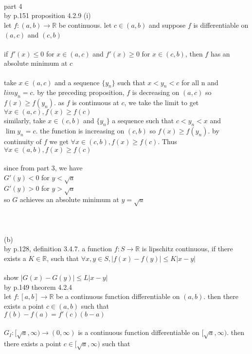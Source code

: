 \documentclass[12pt, border = 4pt, multi]{article} %
\begin{document}
\\
\\
\\
part 4\\
by p.151 proposition 4.2.9 (i)\\
let $f: (a, b) \rightarrow \mathbb{R}$ be continuous. let $c \in (a, b)$ and suppose $f$ is differentiable on $(a, c)$ and $(c, b)$\\
\\
if $f'(x) \leq 0$ for $x \in (a, c)$ and $f'(x) \geq 0$ for $x \in (c,b)$, then $f$ has an absolute minimum at $c$\\
\\
take $x \in (a, c)$ and a sequence
$\{y_n\}$ such that $x < y_n < c$ for all n and $lim y_n = c$. by the preceding proposition, $f$ is decreasing on
$(a, c)$ so $f(x) \geq f(y_n)$. as $f$ is continuous at $c$, we take the limit to get $\forall x \in (a, c), f(x) \geq f(c)$\\
similarly, take $x \in (c, b)$ and $\{y_n\}$ a sequence such that $c < y_n < x$ and $\lim y_n = c$. the function
is increasing on $(c, b)$ so $f(x) \geq f(y_n)$. by continuity of $f$ we get $ \forall x \in (c, b), f(x) \geq f(c)$.
Thus $\forall x \in (a,b), f(x) \geq f(c)$\\
\\
since from part 3, we have\\
$G'(y) < 0$ for $y < \sqrt{a}$\\
$G'(y) > 0$ for $y > \sqrt{a}$\\
so $G$ achieves an absolute minimum at $y = \sqrt{a}$\\
\\
\\
\\
(b)\\
by p.128, definition 3.4.7. a function $f: S \rightarrow \mathbb{R}$ is lipschitz continuous, if there exists a $K \in \mathbb{R}$, such that
$\forall x, y \in S, |f(x) - f(y)| \leq K|x - y|$\\
\\
show $|G(x) - G(y)| \leq L|x - y|$\\
by p.149 theorem 4.2.4\\
let $f: [a, b] \rightarrow \mathbb{R}$ be a continuous function differentiable on
$(a, b)$. then there exists a point $c \in (a, b)$ such that\\
$f(b) - f(a) = f'(c)(b - a)$\\
\\
$G_I: [\sqrt{a}, \infty) \rightarrow (0, \infty)$ is a continuous function differentiable on $[\sqrt{a}, \infty)$. then there exists a point $c \in [\sqrt{a}, \infty)$ such that
\end{document}
